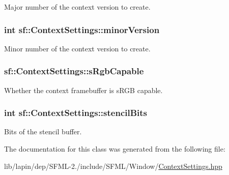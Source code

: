 Major number of the context version to create. 

\hypertarget{structsf_1_1_context_settings_aaeb0efe9d2658b840da93b30554b100f}{
\subsubsection[{minor\-Version}]{ {\bf int} sf\-::\-Context\-Settings\-::minor\-Version}}\label{structsf_1_1_context_settings_aaeb0efe9d2658b840da93b30554b100f}


Minor number of the context version to create. 

\hypertarget{structsf_1_1_context_settings_ac93b041bfb6cbd36034997797708a0a3}{
\subsubsection[{s\-Rgb\-Capable}]{ sf\-::\-Context\-Settings\-::s\-Rgb\-Capable}}\label{structsf_1_1_context_settings_ac93b041bfb6cbd36034997797708a0a3}


Whether the context framebuffer is s\-R\-G\-B capable. 

\hypertarget{structsf_1_1_context_settings_ac2e788c201ca20e84fd38a28071abd29}{
\subsubsection[{stencil\-Bits}]{ {\bf int} sf\-::\-Context\-Settings\-::stencil\-Bits}}\label{structsf_1_1_context_settings_ac2e788c201ca20e84fd38a28071abd29}


Bits of the stencil buffer. 



The documentation for this class was generated from the following file\-:\begin{DoxyCompactItemize}
\item 
lib/lapin/dep/\-S\-F\-M\-L-\/2./include/\-S\-F\-M\-L/\-Window/\hyperlink{lapin_2dep_2_s_f_m_l-2_83_2include_2_s_f_m_l_2_window_2_context_settings_8hpp}{Context\-Settings.\-hpp}\end{DoxyCompactItemize}

